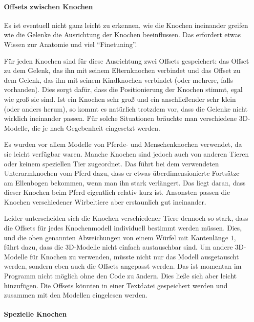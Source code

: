 \paragraph{Offsets zwischen Knochen}
Es ist eventuell nicht ganz leicht zu erkennen, wie die Knochen ineinander greifen \bzw wie die Gelenke die Ausrichtung der Knochen beeinflussen. Das erfordert etwas Wissen zur Anatomie und viel "`Finetuning"'. 

Für jeden Knochen sind für diese Ausrichtung zwei Offsets gespeichert: das Offset zu dem Gelenk, das ihn mit seinem Elternknochen verbindet und das Offset zu dem Gelenk, das ihn mit seinem Kindknochen verbindet (oder mehrere, falls vorhanden). Dies sorgt dafür, dass die Positionierung der Knochen stimmt, egal wie groß sie sind. Ist ein Knochen sehr groß und ein anschließender sehr klein (oder anders herum), so kommt es natürlich trotzdem vor, dass die Gelenke nicht wirklich ineinander passen. Für solche Situationen bräuchte man verschiedene 3D-Modelle, die je nach Gegebenheit eingesetzt werden.

Es wurden vor allem Modelle von Pferde- und Menschenknochen verwendet, da sie leicht verfügbar waren. Manche Knochen sind jedoch auch von anderen Tieren oder keinem speziellen Tier zugeordnet. Das führt \zb bei dem verwendeten Unterarmknochen vom Pferd dazu, dass er etwas überdimensionierte Fortsätze am Ellenbogen bekommen, wenn man ihn stark verlängert. Das liegt daran, dass dieser Knochen beim Pferd eigentlich relativ kurz ist. Ansonsten passen die Knochen verschiedener Wirbeltiere aber erstaunlich gut ineinander.

Leider unterscheiden sich die Knochen verschiedener Tiere dennoch so stark, dass die Offsets für jedes Knochenmodell individuell bestimmt werden müssen. Dies, und die oben genannten Abweichungen von einem Würfel mit Kantenlänge $1$, führt dazu, dass die 3D-Modelle nicht einfach austauschbar sind.
Um andere 3D-Modelle für Knochen zu verwenden, müsste nicht nur das Modell ausgetauscht werden, sondern eben auch die Offsets angepasst werden. Das ist momentan im Programm nicht möglich ohne den Code zu ändern. Dies ließe sich aber leicht hinzufügen. Die Offsets könnten \zb in einer Textdatei gespeichert werden und zusammen mit den Modellen eingelesen werden. 


\paragraph{Spezielle Knochen}

